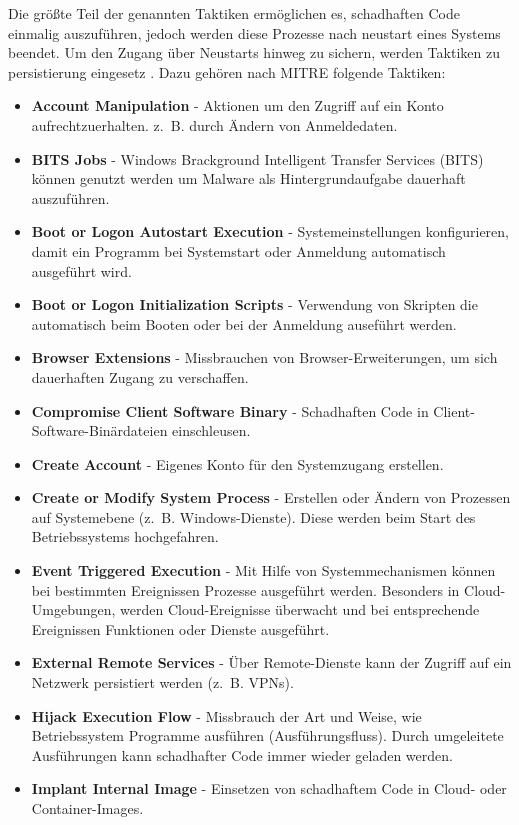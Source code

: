 \documentclass[conference]{IEEEtran}
\begin{document}
Die größte Teil der genannten Taktiken ermöglichen es, schadhaften Code einmalig auszuführen, jedoch werden diese Prozesse nach neustart eines Systems beendet.
Um den Zugang über Neustarts hinweg zu sichern, werden Taktiken zu persistierung eingesetz \cite{MITREPersistence}.
Dazu gehören nach MITRE \cite{MITREPersistence} folgende Taktiken:
\begin{itemize}
    \item \textbf{Account Manipulation} - Aktionen um den Zugriff auf ein Konto aufrechtzuerhalten. z.~B. durch Ändern von Anmeldedaten.
    \item \textbf{BITS Jobs} - Windows Brackground Intelligent Transfer Services (BITS) können genutzt werden um Malware als Hintergrundaufgabe dauerhaft auszuführen.
    \item \textbf{Boot or Logon Autostart Execution} - Systemeinstellungen konfigurieren, damit ein Programm bei Systemstart oder Anmeldung automatisch ausgeführt wird.
    \item \textbf{Boot or Logon Initialization Scripts} - Verwendung von Skripten die automatisch beim Booten oder bei der Anmeldung auseführt werden.
    \item \textbf{Browser Extensions} - Missbrauchen von Browser-Erweiterungen, um sich dauerhaften Zugang zu verschaffen.
    \item \textbf{Compromise Client Software Binary} - Schadhaften Code in Client-Software-Binärdateien einschleusen.
    \item \textbf{Create Account} - Eigenes Konto für den Systemzugang erstellen.
    \item \textbf{Create or Modify System Process} - Erstellen oder Ändern von Prozessen auf Systemebene (z.~B. Windows-Dienste). Diese werden beim Start des Betriebssystems hochgefahren.
    \item \textbf{Event Triggered Execution} - Mit Hilfe von Systemmechanismen können bei bestimmten Ereignissen Prozesse ausgeführt werden. Besonders in Cloud-Umgebungen, werden Cloud-Ereignisse überwacht und bei entsprechende Ereignissen Funktionen oder Dienste ausgeführt.
    \item \textbf{External Remote Services} - Über Remote-Dienste kann der Zugriff auf ein Netzwerk persistiert werden (z.~B. VPNs).
    \item \textbf{Hijack Execution Flow} - Missbrauch der Art und Weise, wie Betriebssystem Programme ausführen (Ausführungsfluss). Durch umgeleitete Ausführungen kann schadhafter Code immer wieder geladen werden.
    \item \textbf{Implant Internal Image} - Einsetzen von schadhaftem Code in Cloud- oder Container-Images.

\end{itemize}
\end{document}
